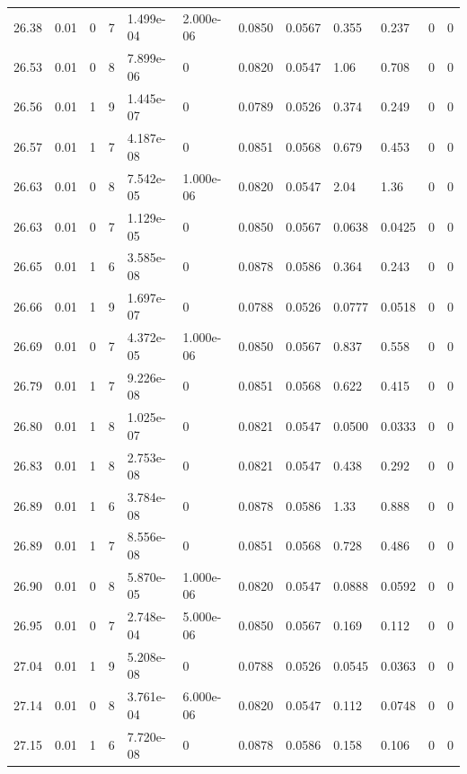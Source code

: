 \documentclass[preview]{standalone}
\begin{document}
{{{{{{{\begin{tabular}{L{1.2cm}C{1.2cm} C{0.3cm}C{0.5cm} C{1.4cm}C{1.4cm} C{1.4cm}C{1.4cm} C{1.6cm}C{1.6cm} C{1.6cm}C{1.6cm}}
  26.38  &  0.01  & 0     &  7 &  1.499e-04  & 2.000e-06  &  0.0850&   0.0567& 0.355 & 0.237   &  0 & 0  \\ 
  26.53  &  0.01  & 0     &  8 &  7.899e-06  & 0  &  0.0820&   0.0547& 1.06 & 0.708   &  0 & 0  \\ 
  26.56  &  0.01  & 1     &  9 &  1.445e-07  & 0  &  0.0789&   0.0526& 0.374 & 0.249   &  0 & 0  \\ 
  26.57  &  0.01  & 1     &  7 &  4.187e-08  & 0  &  0.0851&   0.0568& 0.679 & 0.453   &  0 & 0  \\ 
  26.63  &  0.01  & 0     &  8 &  7.542e-05  & 1.000e-06  &  0.0820&   0.0547& 2.04 & 1.36   &  0 & 0  \\ 
  26.63  &  0.01  & 0     &  7 &  1.129e-05  & 0  &  0.0850&   0.0567& 0.0638 & 0.0425   &  0 & 0  \\ 
  26.65  &  0.01  & 1     &  6 &  3.585e-08  & 0  &  0.0878&   0.0586& 0.364 & 0.243   &  0 & 0  \\ 
  26.66  &  0.01  & 1     &  9 &  1.697e-07  & 0  &  0.0788&   0.0526& 0.0777 & 0.0518   &  0 & 0  \\ 
  26.69  &  0.01  & 0     &  7 &  4.372e-05  & 1.000e-06  &  0.0850&   0.0567& 0.837 & 0.558   &  0 & 0  \\ 
  26.79  &  0.01  & 1     &  7 &  9.226e-08  & 0  &  0.0851&   0.0568& 0.622 & 0.415   &  0 & 0  \\ 
  26.80  &  0.01  & 1     &  8 &  1.025e-07  & 0  &  0.0821&   0.0547& 0.0500 & 0.0333   &  0 & 0  \\ 
  26.83  &  0.01  & 1     &  8 &  2.753e-08  & 0  &  0.0821&   0.0547& 0.438 & 0.292   &  0 & 0  \\ 
  26.89  &  0.01  & 1     &  6 &  3.784e-08  & 0  &  0.0878&   0.0586& 1.33 & 0.888   &  0 & 0  \\ 
  26.89  &  0.01  & 1     &  7 &  8.556e-08  & 0  &  0.0851&   0.0568& 0.728 & 0.486   &  0 & 0  \\ 
  26.90  &  0.01  & 0     &  8 &  5.870e-05  & 1.000e-06  &  0.0820&   0.0547& 0.0888 & 0.0592   &  0 & 0  \\ 
  26.95  &  0.01  & 0     &  7 &  2.748e-04  & 5.000e-06  &  0.0850&   0.0567& 0.169 & 0.112   &  0 & 0  \\ 
  27.04  &  0.01  & 1     &  9 &  5.208e-08  & 0  &  0.0788&   0.0526& 0.0545 & 0.0363   &  0 & 0  \\ 
  27.14  &  0.01  & 0     &  8 &  3.761e-04  & 6.000e-06  &  0.0820&   0.0547& 0.112 & 0.0748   &  0 & 0  \\ 
  27.15  &  0.01  & 1     &  6 &  7.720e-08  & 0  &  0.0878&   0.0586& 0.158 & 0.106   &  0 & 0  \\ 

\end{tabular}}}}}}}}
\end{document}
